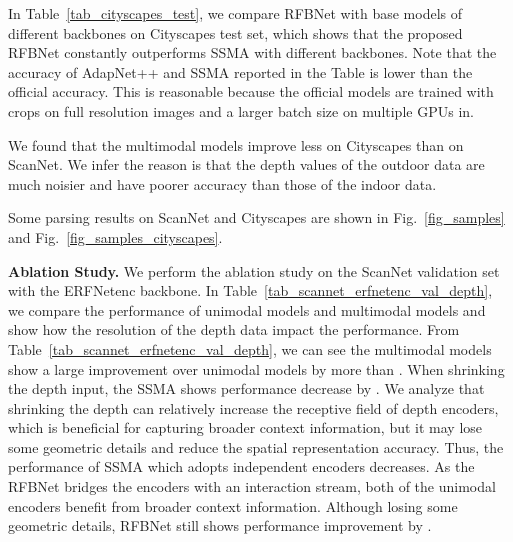 \documentclass[letterpaper, 10 pt, conference]{ieeeconf}
\begin{document}
	In Table~\ref{tab_cityscapes_test}, we compare RFBNet with base models of different backbones on Cityscapes test set, which shows that the proposed RFBNet constantly outperforms SSMA with different backbones. Note that the accuracy of AdapNet++ and SSMA reported in the Table is lower than the official accuracy. This is reasonable because the official models are trained with crops on full resolution images and a larger batch size on multiple GPUs in\cite{valada2019self}.
	
	
	We found that the multimodal models improve less on Cityscapes than on ScanNet. We infer the reason is that the depth values of the outdoor data are much noisier and have poorer accuracy than those of the indoor data.
	
	Some parsing results on ScanNet and Cityscapes are shown in Fig.~\ref{fig_samples} and Fig.~\ref{fig_samples_cityscapes}.
	
	\textbf{Ablation Study.} We perform the ablation study on the ScanNet validation set with the ERFNetenc backbone. In Table~\ref{tab_scannet_erfnetenc_val_depth}, we compare the performance of unimodal models and multimodal models and show how the resolution of the depth data impact the performance. From Table~\ref{tab_scannet_erfnetenc_val_depth}, we can see the multimodal models show a large improvement over unimodal models by more than . When shrinking the depth input, the SSMA shows performance decrease by . We analyze that shrinking the depth can relatively increase the receptive field of depth encoders, which is beneficial for capturing broader context information, but it may lose some geometric details and reduce the spatial representation accuracy. Thus, the performance of SSMA which adopts independent encoders decreases. As the RFBNet bridges the encoders with an interaction stream, both of the unimodal encoders benefit from broader context information. Although losing some geometric details, RFBNet still shows performance improvement by .
	
\end{document}
